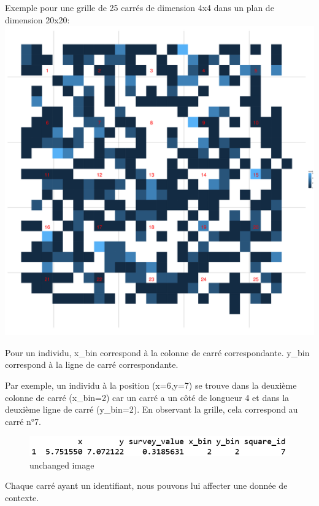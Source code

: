 \documentclass[
]{article}
\newenvironment{Shaded}{\begin{snugshade}}{\end{snugshade}}
\newcommand{\CommentTok}[1]{\textcolor[rgb]{0.56,0.35,0.01}{\textit{#1}}}
\newcommand{\NormalTok}[1]{#1}
\newcommand{\OtherTok}[1]{\textcolor[rgb]{0.56,0.35,0.01}{#1}}
\newcommand{\SpecialCharTok}[1]{\textcolor[rgb]{0.00,0.00,0.00}{#1}}
\begin{document}
Exemple pour une grille de 25 carrés de dimension 4x4 dans un plan de
dimension 20x20:
\includegraphics{Templates/survey_data_square_with_ID.png}

Pour un individu, x\_bin correspond à la colonne de carré
correspondante. y\_bin correspond à la ligne de carré correspondante.

Par exemple, un individu à la position (x=6,y=7) se trouve dans la
deuxième colonne de carré (x\_bin=2) car un carré a un côté de longueur
4 et dans la deuxième ligne de carré (y\_bin=2). En observant la grille,
cela correspond au carré n°7.

\begin{figure}
\centering
\includegraphics{Templates/Screenshot 2023-02-21 at 17-02-20 RStudio Server.png}
\caption{unchanged image}
\end{figure}

Chaque carré ayant un identifiant, nous pouvons lui affecter une donnée
de contexte.

\begin{Shaded}
\end{Shaded}
\end{document}
